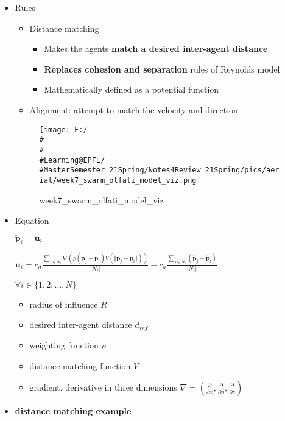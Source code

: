 \documentclass[]{article}
\begin{document}
\begin{itemize}
\item
  Rules

  \begin{itemize}
  \item
    Distance matching

    \begin{itemize}
    \item
      Makes the agents \textbf{match a desired inter-agent distance}
    \item
      \textbf{Replaces cohesion and separation} rules of Reynolds model
    \item
      Mathematically defined as a potential function
    \end{itemize}
  \item
    Alignment: attempt to match the velocity and direction
  \end{itemize}

  \begin{figure}
  \centering
  \texttt{[image: F:/\\\#\\\#\\\#Learning@EPFL/\\\#MasterSemester\_21Spring/Notes4Review\_21Spring/pics/aerial/week7\_swarm\_olfati\_model\_viz.png]}
  \caption{week7\_swarm\_olfati\_model\_viz}
  \end{figure}
\item
  Equation

  \(\ddot{\mathbf{p}}_{i}=\mathbf{u}_{i}\)

  \(\mathbf{u}_{i}=c_{d} \frac{\sum_{j \in N_{i}} \nabla \left(\rho(\mathbf{p}_{j}-\mathbf{p}_{i}) V (\Vert \mathbf{p}_{j}-\mathbf{p}_{i}\Vert) \right)}{\left|N_{i}\right|}-c_{a} \frac{\sum_{j \in N_{i}} (\dot{\mathbf{p}}_{j}-\dot{\mathbf{p}}_{i})}{\left|N_{i}\right|}\)

  \(\forall i \in\{1,2, \ldots, N\}\)

  \begin{itemize}
  \item
    radius of influence \(R\)
  \item
    desired inter-agent distance \(d_{ref}\)
  \item
    weighting function \(\rho\)
  \item
    distance matching function \(V\)
  \item
    gradient, derivative in three dimensions
    \(\nabla=\left(\frac{\partial}{\partial x}, \frac{\partial}{\partial y}, \frac{\partial}{\partial z}\right)\)
  \end{itemize}
\item
  \textbf{distance matching example}


\end{itemize}
\end{document}
